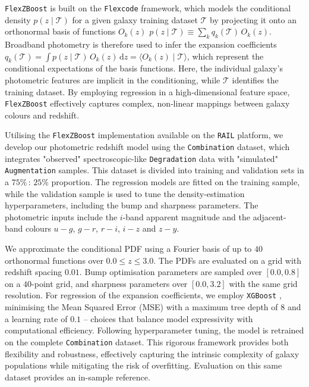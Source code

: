 \texttt{FlexZBoost} is built on the \texttt{Flexcode} framework, which models the conditional density \(p(z \mid \mathcal{T})\) for a given galaxy training dataset \(\mathcal{T}\) by projecting it onto an orthonormal basis of functions \(O_{k}(z)\) \(p(z \mid \mathcal{T}) \equiv \sum_{k} q_{k}(\mathcal{T}) \, O_{k}(z)\). Broadband photometry is therefore used to infer the expansion coefficients \(q_{k} (\mathcal{T}) = \int p(z \mid \mathcal{T}) \, O_{k}(z) \, \mathrm{d}z = \bigl\langle O_{k}(z) \mid \mathcal{T}\bigr\rangle\), which represent the conditional expectations of the basis functions. Here, the individual galaxy's photometric features are implicit in the conditioning, while \(\mathcal{T}\) identifies the training dataset. By employing regression in a high‐dimensional feature space, \texttt{FlexZBoost} effectively captures complex, non‐linear mappings between galaxy colours and redshift.

Utilising the \texttt{FlexZBoost} implementation available on the \texttt{RAIL} platform, we develop our photometric redshift model using the \texttt{Combination} dataset, which integrates "observed" spectroscopic-like \texttt{Degradation} data with "simulated" \texttt{Augmentation} samples. This dataset is divided into training and validation sets in a \(75\% \,{:}\, 25\%\) proportion. The regression models are fitted on the training sample, while the validation sample is used to tune the density-estimation hyperparameters, including the bump and sharpness parameters. The photometric inputs include the \(i\)-band apparent magnitude and the adjacent-band colours \(u-g\), \(g-r\), \(r-i\), \(i-z\) and \(z-y\).

We approximate the conditional PDF using a Fourier basis of up to \(40\) orthonormal functions over \(0.0 \le z \le 3.0\). The PDFs are evaluated on a grid with redshift spacing \(0.01\). Bump optimisation parameters are sampled over \([0.0, 0.8]\) on a \(40\)-point grid, and sharpness parameters over \([0.0, 3.2]\) with the same grid resolution. For regression of the expansion coefficients, we employ \texttt{XGBoost} \citep{2016arXiv160302754C}, minimising the Mean Squared Error (MSE) with a maximum tree depth of \(8\) and a learning rate of \(0.1\) -- choices that balance model expressivity with computational efficiency. Following hyperparameter tuning, the model is retrained on the complete \texttt{Combination} dataset. This rigorous framework provides both flexibility and robustness, effectively capturing the intrinsic complexity of galaxy populations while mitigating the risk of overfitting. Evaluation on this same dataset provides an in-sample reference.

